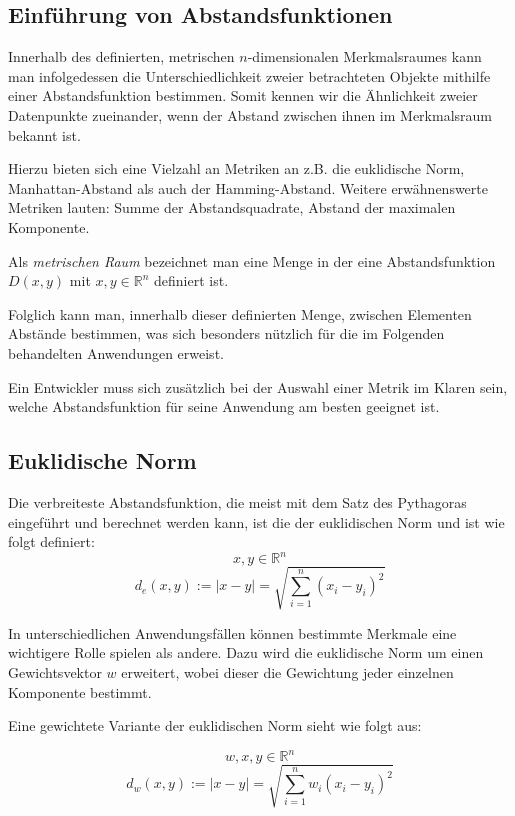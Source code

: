 \documentclass[fontsize=11pt]{scrartcl}
\begin{document}
            \subsection{Einführung von Abstandsfunktionen}
                Innerhalb des definierten, metrischen $n$-dimensionalen Merkmalsraumes kann man infolgedessen die Unterschiedlichkeit zweier betrachteten Objekte mithilfe einer Abstandsfunktion bestimmen. Somit kennen wir die Ähnlichkeit zweier Datenpunkte zueinander, wenn der Abstand zwischen ihnen im Merkmalsraum bekannt ist.\par Hierzu bieten sich eine Vielzahl an Metriken an z.B. die euklidische Norm, Manhattan-Abstand als auch der Hamming-Abstand. Weitere erwähnenswerte Metriken lauten: Summe der Abstandsquadrate, Abstand der maximalen Komponente.\par 
                Als \emph{metrischen Raum} bezeichnet man eine Menge in der eine Abstandsfunktion $D(x,y)$ mit $x,y \in \mathbb{R}^n$ definiert ist.\par
                Folglich kann man, innerhalb dieser definierten Menge, zwischen Elementen Abstände bestimmen, was sich besonders nützlich für die im Folgenden behandelten Anwendungen erweist. \par
                Ein Entwickler muss sich zusätzlich bei der Auswahl einer Metrik im Klaren sein, welche Abstandsfunktion für seine Anwendung am besten geeignet ist.
            \subsection{Euklidische Norm}
                Die verbreiteste Abstandsfunktion, die meist mit dem Satz des Pythagoras eingeführt und berechnet werden kann, ist die der euklidischen Norm und ist wie folgt definiert:
                $$ x,y \in \mathbb{R}^n $$
                $$
                    d_e(x,y):= |x - y| = \sqrt{\sum_{i=1}^{n}(x_i -y_i)^2}
                $$\par
                In unterschiedlichen Anwendungsfällen können bestimmte Merkmale eine wichtigere Rolle spielen als andere.\cite{ertel2016_p207} Dazu wird die euklidische Norm um einen Gewichtsvektor $w$ erweitert, wobei dieser die Gewichtung jeder einzelnen Komponente bestimmt.\par Eine gewichtete Variante der euklidischen Norm sieht wie folgt aus:\par
                $$w,x,y \in \mathbb{R}^n $$
                $$
                    d_w(x,y):= |x - y| = \sqrt{\sum_{i=1}^{n}w_i(x_i -y_i)^2}
                $$     
            
\end{document}
